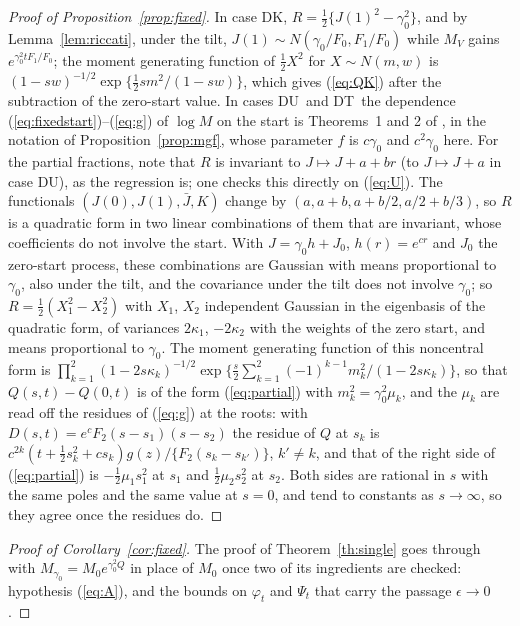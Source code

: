 \documentclass[ecta,nameyear,final]{econsocart}
\newcommand{\Fk}{\textsf{\upshape DK}}
\newcommand{\Fu}{\textsf{\upshape DU}}
\newcommand{\Ft}{\textsf{\upshape DT}}
\theoremstyle{plain}
\theoremstyle{definition}
\begin{document}
\begin{appendix}
\begin{proof}[Proof of Proposition~\ref{prop:fixed}]
In case \Fk, $R=\frac12\{J(1)^2-\gamma_0^2\}$, and by Lemma~\ref{lem:riccati}, under the tilt, $J(1)\sim N(\gamma_0/F_0,F_1/F_0)$ while $M_V$ gains $e^{\gamma_0^2tF_1/F_0}$; the moment generating function of $\frac12X^2$ for $X\sim N(m,w)$ is $(1-sw)^{-1/2}\exp\{\frac12sm^2/(1-sw)\}$, which gives (\ref{eq:QK}) after the subtraction of the zero-start value.  In cases \Fu\ and \Ft\ the dependence (\ref{eq:fixedstart})--(\ref{eq:g}) of $\log M$ on the start is Theorems~1 and 2 of \cite{NabeyaSorensen1994}, in the notation of Proposition~\ref{prop:mgf}, whose parameter $f$ is $c\gamma_0$ and $c^2\gamma_0$ here.  For the partial fractions, note that $R$ is invariant to $J\mapsto J+a+br$ (to $J\mapsto J+a$ in case \Fu), as the regression is; one checks this directly on (\ref{eq:U}).  The functionals $(J(0),J(1),\bar J,K)$ change by $(a,a+b,a+b/2,a/2+b/3)$, so $R$ is a quadratic form in two linear combinations of them that are invariant, whose coefficients do not involve the start.  With $J=\gamma_0h+J_0$, $h(r)=e^{cr}$ and $J_0$ the zero-start process, these combinations are Gaussian with means proportional to $\gamma_0$, also under the tilt, and the covariance under the tilt does not involve $\gamma_0$; so $R=\frac12(X_1^2-X_2^2)$ with $X_1$, $X_2$ independent Gaussian in the eigenbasis of the quadratic form, of variances $2\kappa_1$, $-2\kappa_2$ with the weights of the zero start, and means proportional to $\gamma_0$.  The moment generating function of this noncentral form is $\prod_{k=1}^2(1-2s\kappa_k)^{-1/2}\exp\{\frac s2\sum_{k=1}^2(-1)^{k-1}m_k^2/(1-2s\kappa_k)\}$, so that $Q(s,t)-Q(0,t)$ is of the form (\ref{eq:partial}) with $m_k^2=\gamma_0^2\mu_k$, and the $\mu_k$ are read off the residues of (\ref{eq:g}) at the roots: with $D(s,t)=e^cF_2(s-s_1)(s-s_2)$ the residue of $Q$ at $s_k$ is $c^{2k}(t+\frac12s_k^2+cs_k)g(z)/\{F_2(s_k-s_{k'})\}$, $k'\ne k$, and that of the right side of (\ref{eq:partial}) is $-\frac12\mu_1s_1^2$ at $s_1$ and $\frac12\mu_2s_2^2$ at $s_2$.  Both sides are rational in $s$ with the same poles and the same value at $s=0$, and tend to constants as $s\to\infty$, so they agree once the residues do.
\end{proof}\begin{proof}[Proof of Corollary~\ref{cor:fixed}]
The proof of Theorem~\ref{th:single} goes through with $M_{\gamma_0}=M_0e^{\gamma_0^2Q}$ in place of $M_0$ once two of its ingredients are checked: hypothesis (\ref{eq:A}), and the bounds on $\varphi_t$ and $\Psi_t$ that carry the passage $\epsilon\to0$.


\end{proof}
\end{appendix}
\end{document}
